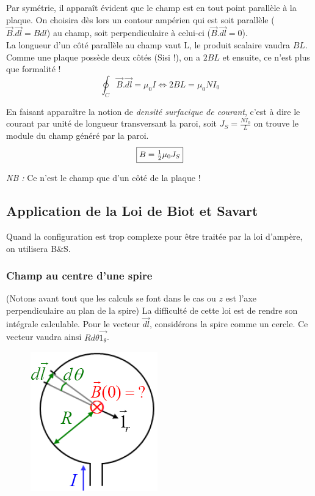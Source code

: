 \documentclass	[11pt, a4paper, openany]{book}
\begin{document}
Par symétrie, il apparaît évident que le champ est en tout point parallèle à la plaque. On choisira dès lors un contour ampérien qui est soit parallèle ($\vec{B}.\vec{dl} = Bdl$) au champ, soit perpendiculaire à celui-ci ($\vec{B}.\vec{dl} = 0$). \\
La longueur d'un côté parallèle au champ vaut L, le produit scalaire vaudra $BL$. Comme une plaque possède deux côtés (Sisi !), on a $2BL$ et ensuite, ce n'est plus que formalité ! 
\begin{equation}
\oint_C \vec{B}.\vec{dl} = \mu_0I \Leftrightarrow 2BL = \mu_0N I_0
\end{equation}

En faisant apparaître la notion de \textit{densité surfacique de courant}, c'est à dire le courant par unité de longueur transversant la paroi, soit $J_S = \frac{NI_0}{L}$ on trouve le module du champ généré par la paroi.
\begin{equation}
\fbox{$B = \frac{1}{2}\mu_0J_S$}
\end{equation}

\textit{NB :} Ce n'est le champ que d'un côté de la plaque !

\subsection{Application de la Loi de Biot et Savart}
Quand la configuration est trop complexe pour être traitée par la loi d'ampère, on utilisera B\&S.

\subsubsection{Champ au centre d'une spire}
(Notons avant tout que les calculs se font dans le cas ou $z$ est l'axe perpendiculaire au plan de la spire)
La difficulté de cette loi est de rendre son intégrale calculable. Pour le vecteur $\vec{dl}$, considérons la spire comme  un cercle. Ce vecteur vaudra ainsi $Rd\theta\vec{1_\theta}$. 

\begin{figure}
\includegraphics[scale=0.55]{magneto/image8.png}
\end{figure}
\end{document}
